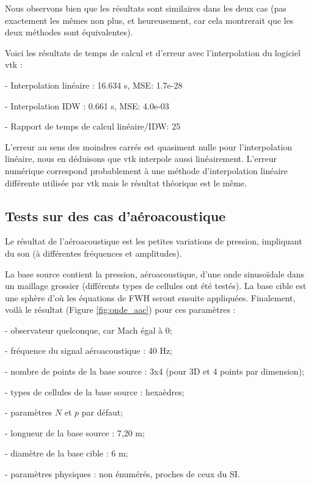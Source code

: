 Nous observons bien que les résultats sont similaires dans les deux cas (pas exactement les mêmes non plus, et heureusement, car cela montrerait que les deux méthodes sont équivalentes).

Voici les résultats de temps de calcul et d'erreur avec l'interpolation du logiciel vtk :

- Interpolation linéaire :         16.634 s, MSE: 1.7e-28

- Interpolation IDW :\hspace{0,4cm} 0.661 s, MSE: 4.0e-03

- Rapport de temps de calcul linéaire/IDW: 25

L'erreur au sens des moindres carrés est quasiment nulle pour l'interpolation linéaire, nous en déduisons que vtk interpole aussi linéairement. L'erreur numérique correspond probablement à une méthode d'interpolation linéaire différente utilisée par vtk mais le résultat théorique est le même.

\subsection{Tests sur des cas d'aéroacoustique}

Le résultat de l'aéroacoustique est les petites variations de pression, impliquant du son (à différentes fréquences et amplitudes).

La base source contient la pression, aéroacoustique, d'une onde sinusoïdale dans un maillage grossier (différents types de cellules ont été testés). La base cible est une sphère d'où les équations de FWH seront ensuite appliquées. Finalement, voilà le résultat (Figure \ref{fig:onde_aac}) pour ces paramètres :

- observateur quelconque, car Mach égal à 0;

- fréquence du signal aéroacoustique : 40 Hz;

- nombre de points de la base source : 3x4 (pour 3D et 4 points par dimension);

- types de cellules de la base source : hexaèdres;

- paramètres \(N\) et \(p\) par défaut;

- longueur de la base source : 7,20 m;

- diamètre de la base cible : 6 m;

- paramètres physiques : non énumérés, proches de ceux du \ac{SI}. 

